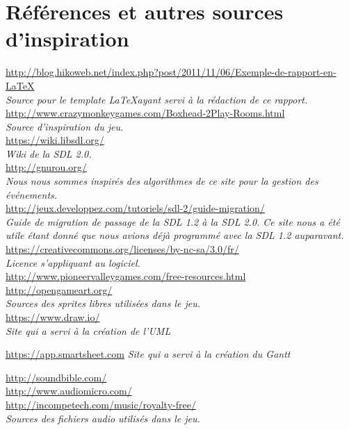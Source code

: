 \section*{Références et autres sources d'inspiration}

\url{http://blog.hikoweb.net/index.php?post/2011/11/06/Exemple-de-rapport-en-LaTeX} \\
\emph{Source pour le template \LaTeX ayant servi à la rédaction de ce rapport.} \\

\url{http://www.crazymonkeygames.com/Boxhead-2Play-Rooms.html} \\
\emph{Source d'inspiration du jeu.} \\

\url{https://wiki.libsdl.org/} \\
\emph{Wiki de la SDL 2.0.} \\

\url{http://gnurou.org/} \\
\emph{Nous nous sommes inspirés des algorithmes de ce site pour la gestion des événements.} \\

\url{http://jeux.developpez.com/tutoriels/sdl-2/guide-migration/} \\
\emph{Guide de migration de passage de la SDL 1.2 à la SDL 2.0. Ce site nous a été utile étant donné
que nous avions déjà programmé avec la SDL 1.2 auparavant.} \\

\url{https://creativecommons.org/licenses/by-nc-sa/3.0/fr/} \\
\emph{Licence s'appliquant au logiciel.} \\

\url{http://www.pioneervalleygames.com/free-resources.html} \\
\url{http://opengameart.org/} \\
\emph{Sources des sprites libres utilisées dans le jeu.} \\

\url{https://www.draw.io/} \\
\emph{Site qui a servi à la création de l'UML}

\url{https://app.smartsheet.com}
\emph{Site qui a servi à la création du Gantt}

\url{http://soundbible.com/} \\
\url{http://www.audiomicro.com/} \\
\url{http://incompetech.com/music/royalty-free/} \\
\emph{Sources des fichiers audio utilisés dans le jeu.} \\

